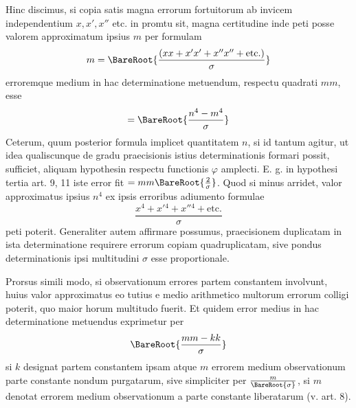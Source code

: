 Hinc discimus, si copia satis magna errorum fortuitorum ab invicem independentium \(x,x',x''\) etc. in promtu sit, magna certitudine inde peti posse valorem approximatum ipsius \(m\) per formulam
\[
m=\BareRoot{\frac{(xx+x'x'+x''x''+\text{etc.})}{\sigma}}
\]
erroremque medium in hac determinatione metuendum, respectu quadrati \(mm\), esse
\[
=\BareRoot{\frac{n^4-m^4}{\sigma}}
\]
Ceterum, quum posterior formula implicet quantitatem \(n\), si id tantum agitur, ut idea qualiscunque de gradu praecisionis istius determinationis formari possit, sufficiet, aliquam hypothesin respectu functionis \(\varphi\) amplecti. E. g. in hypothesi tertia art. 9, 11 iste error fit \(=mm\BareRoot{\frac2\sigma}\). Quod si minus arridet, valor approximatus ipsius \(n^4\) ex ipsis erroribus adiumento formulae
\[
\frac{x^4+x'{}^4+x''{}^4+\text{etc.}}{\sigma}
\]
peti poterit. Generaliter autem affirmare possumus, praecisionem duplicatam in ista determinatione requirere errorum copiam quadruplicatam, sive pondus determinationis ipsi multitudini \(\sigma\) esse proportionale.

Prorsus simili modo, si observationum errores partem constantem involvunt, huius valor approximatus eo tutius e medio arithmetico multorum errorum colligi poterit, quo maior horum multitudo fuerit. Et quidem error medius in hac determinatione metuendus exprimetur per
\[
\BareRoot{\frac{mm-kk}{\sigma}}
\]
si \(k\) designat partem constantem ipsam atque \(m\) errorem medium observationum parte constante nondum purgatarum, sive simpliciter per \(\frac{m}{\BareRoot{\sigma}}\), si \(m\) denotat errorem medium observationum a parte constante liberatarum (v. art. 8).

